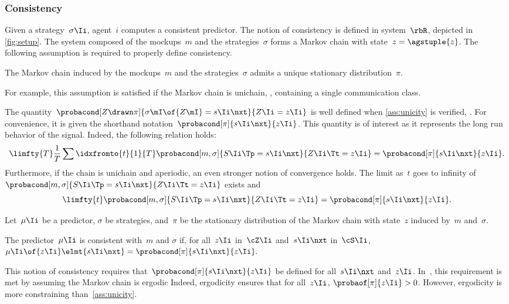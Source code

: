 \subsubsection{Consistency}

Given a strategy~\(\sigma\Ii\), agent~\(i\) computes a consistent predictor.
The notion of consistency is defined in system~\(\rbR\), depicted in \cref{fig:setup}.
The system composed of the mockups~\(m\) and the strategies~\(\sigma\) forms a Markov chain with state~\(z = \agstuple{z}\).
The following assumption is required to properly define consistency.

\begin{assumption}
\label{ass:unicity}
The Markov chain induced by the mockups~\(m\) and the strategies~\(\sigma\) admits a unique stationary distribution~\(\pi\).
\end{assumption}

For example, this assumption is satisfied if the Markov chain is unichain, \ie, containing a single communication class.

The quantity~\(\probacond[Z \drawn \pi]{\sigma\mI \of{Z\mI} = s\Ii\nxt}{Z\Ii = z\Ii}\) is well defined when \cref{ass:unicity} is verified, .
For convenience, it is given the shorthand notation~\(\probacond[\pi]{s\Ii\nxt}{z\Ii}\).
This quantity is of interest as it represents the long run behavior of the signal.
Indeed, the following relation holds:
\[
\limfty{T} \frac{1}{T} \sum\idxfromto{t}{1}{T} \probacond[m, \sigma]{S\Ii\Tp = s\Ii\nxt}{Z\Ii\Tt = z\Ii}
=
\probacond[\pi]{s\Ii\nxt}{z\Ii}
.
\]
Furthermore, if the chain is unichain and aperiodic, an even stronger notion of convergence holds.
The limit as~\(t\) goes to infinity of~\(\probacond[m, \sigma]{S\Ii\Tp = s\Ii\nxt}{Z\Ii\Tt = z\Ii}\) exists and
\[
\limfty{t} \probacond[m, \sigma]{S\Ii\Tp = s\Ii\nxt}{Z\Ii\Tt = z\Ii}
=
\probacond[\pi]{s\Ii\nxt}{z\Ii}
.
\]

\begin{definition}[Consistency]
Let~\(\mu\Ii\) be a predictor, \(\sigma\) be strategies, and~\(\pi\) be the stationary distribution of the Markov chain with state~\(z\) induced by~\(m\) and~\(\sigma\).

The predictor~\(\mu\Ii\) is consistent with~\(m\)  and \(\sigma\) if, for all~\(z\Ii\) in~\(\cZ\Ii\) and~\(s\Ii\nxt\) in~\(\cS\Ii\),
\(
\mu\Ii \of{z\Ii} \elmt{s\Ii\nxt}
=
\probacond[\pi]{s\Ii\nxt}{z\Ii}
.
\)
\end{definition}

This notion of consistency requires that~\(\probacond[\pi]{s\Ii\nxt}{z\Ii}\) be defined for all~\(s\Ii\nxt\) and~\(z\Ii\).
In~\cite{dudebout_shamma:2012}, this requirement is met by assuming the Markov chain is ergodic
Indeed, ergodicity ensures that for all~\(z\Ii\), \(\probaof[\pi]{z\Ii} > 0\).
However, ergodicity is more constraining than~\cref{ass:unicity}.


